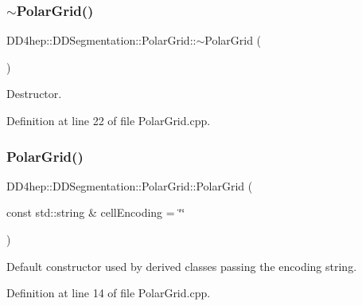 \subsubsection{\texorpdfstring{$\sim$\+Polar\+Grid()}{~PolarGrid()}}
{\footnotesize\ttfamily D\+D4hep\+::\+D\+D\+Segmentation\+::\+Polar\+Grid\+::$\sim$\+Polar\+Grid (\begin{DoxyParamCaption}{ }\end{DoxyParamCaption})\hspace{0.3cm}{\ttfamily [virtual]}}



Destructor. 



Definition at line 22 of file Polar\+Grid.\+cpp.

\hypertarget{class_d_d4hep_1_1_d_d_segmentation_1_1_polar_grid_ac8fe161b5a7730ac7bf6f3a3a45f70a6}{}\label{class_d_d4hep_1_1_d_d_segmentation_1_1_polar_grid_ac8fe161b5a7730ac7bf6f3a3a45f70a6} 
\subsubsection{\texorpdfstring{Polar\+Grid()}{PolarGrid()}\hspace{0.1cm}{\footnotesize\ttfamily [1/2]}}
{\footnotesize\ttfamily D\+D4hep\+::\+D\+D\+Segmentation\+::\+Polar\+Grid\+::\+Polar\+Grid (\begin{DoxyParamCaption}\item[{const std\+::string \&}]{cell\+Encoding = {\ttfamily \char`\"{}\char`\"{}} }\end{DoxyParamCaption})\hspace{0.3cm}{\ttfamily [protected]}}



Default constructor used by derived classes passing the encoding string. 



Definition at line 14 of file Polar\+Grid.\+cpp.

\hypertarget{class_d_d4hep_1_1_d_d_segmentation_1_1_polar_grid_a292c46648971f17f21fa556425d1fd66}{}\label{class_d_d4hep_1_1_d_d_segmentation_1_1_polar_grid_a292c46648971f17f21fa556425d1fd66} 
